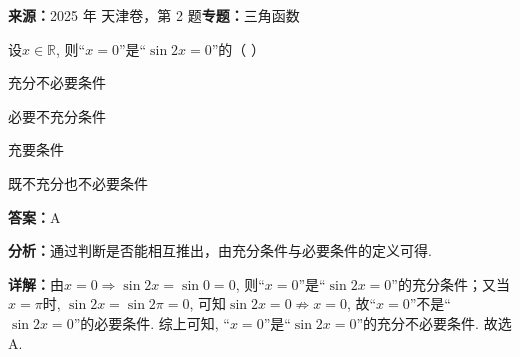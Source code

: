 \begin{question}[points=5]
\textbf{来源：}2025 年 天津卷，第 2 题\quad \textbf{专题：}三角函数\par
设$x \in \mathbb{R}$, 则“$x = 0$”是“$\sin 2x = 0$”的（   ）
\begin{choices}
  \item 充分不必要条件
  \item 必要不充分条件
  \item 充要条件
  \item 既不充分也不必要条件
\end{choices}
\begin{solution}
\textbf{答案：}A

\textbf{分析：}通过判断是否能相互推出，由充分条件与必要条件的定义可得.

\textbf{详解：}由$x = 0 \Rightarrow \sin 2x = \sin 0 = 0$, 则“$x = 0$”是“$\sin 2x = 0$”的充分条件；又当$x = \pi$时, $\sin 2x = \sin 2\pi = 0$, 可知$\sin 2x = 0 \not\Rightarrow x = 0$, 故“$x = 0$”不是“$\sin 2x = 0$”的必要条件. 综上可知, “$x = 0$”是“$\sin 2x = 0$”的充分不必要条件. 故选A.
\end{solution}
\end{question}

